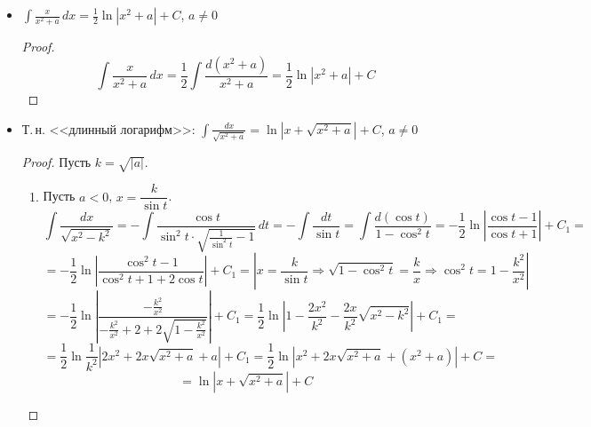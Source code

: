 \begin{itemize}
	\item $\displaystyle \int \frac{x}{x^2 + a}\,dx = \frac12 \ln |x^2 + a| + C$, $a \neq 0$
	\begin{proof}
	\begin{equation*}
	\int \frac{x}{x^2 + a}\,dx =
	\frac12 \int \frac{d(x^2 + a)}{x^2 + a} =
	\frac12 \ln |x^2 + a| + C
	\end{equation*}
	\end{proof}
	
	\item Т.\,н. <<длинный логарифм>>: $\displaystyle \int \frac{dx}{\sqrt{x^2 + a}} = \ln \left| x + \sqrt{x^2 + a} \right| + C$, $a \neq 0$
	\begin{proof}
	Пусть $k = \sqrt{|a|}$.
	\begin{enumerate}
		\item Пусть $a < 0$, $x = \dfrac{k}{\sin t}$.
		\begin{equation*}
		\int \frac{dx}{\sqrt{x^2 - k^2}} =
		-\int \frac{\cos t}{\sin^2 t \cdot \sqrt{\frac1{\sin^2 t} - 1}}\,dt =
		-\int \frac{dt}{\sin t} =
		\int \frac{d(\cos t)}{1 - \cos^2 t} =
		-\frac12 \ln \left| \frac{\cos t - 1}{\cos t + 1} \right| + C_1 =
		\end{equation*}
		\begin{equation*}
		= -\frac12 \ln \left| \frac{\cos^2 t - 1}{\cos^2 t + 1 + 2\cos t} \right| + C_1 =
		\left| x = \frac{k}{\sin t} \Rightarrow
		\sqrt{1 - \cos^2 t} = \frac{k}x \Rightarrow
		\cos^2 t = 1 - \frac{k^2}{x^2} \right|
		\end{equation*}
		\begin{equation*}
		= -\frac12 \ln \left| \frac{-\frac{k^2}{x^2}}{-\frac{k^2}{x^2} + 2 + 2\sqrt{1 - \frac{k^2}{x^2}}} \right| + C_1 =
		\frac12 \ln \left| 1 - \frac{2x^2}{k^2} - \frac{2x}{k^2}\sqrt{x^2 - k^2} \right| + C_1 =
		\end{equation*}
		\begin{equation*}
		= \frac12 \ln \frac1{k^2} \left| 2x^2 + 2x\sqrt{x^2 + a} + a \right| + C_1 =
		\frac12 \ln \left| x^2 + 2x\sqrt{x^2 + a} + (x^2 + a) \right| + C =
		\end{equation*}
		\begin{equation*}
		= \ln \left| x + \sqrt{x^2 + a} \right| + C
		\end{equation*}
		

\end{enumerate}
\end{proof}
\end{itemize}
